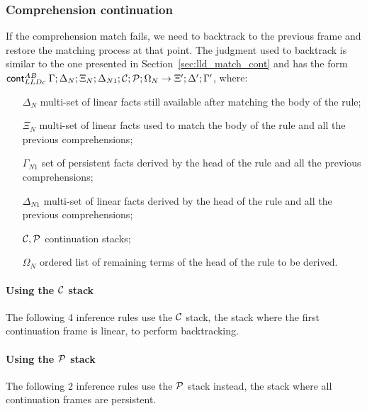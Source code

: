 \subsubsection{Comprehension continuation}

If the comprehension match fails, we need to backtrack to the previous frame and
restore the matching process at that point. The judgment used to backtrack is
similar to the one presented in Section~\ref{sec:lld_match_cont} and has the
form $\mathsf{cont}_{LLDc}^{AB} \; \Gamma; \Delta_N; \Xi_N; \Delta_{N1}; \mathcal{C}; \mathcal{P}; \Omega_N
\rightarrow \Xi'; \Delta'; \Gamma'$, where:

\begin{enumerate}
   \item[$\Delta_N$] multi-set of linear facts still available after matching
   the body of the rule;
   \item[$\Xi_N$] multi-set of linear facts used to match the body of the rule
   and all the previous comprehensions;
   \item[$\Gamma_{N1}$] set of persistent facts derived by the head of the rule
   and all the previous comprehensions;
   \item[$\Delta_{N1}$] multi-set of linear facts derived by the head of the
   rule and all the previous comprehensions;
   \item[$\mathcal{C}, \mathcal{P}$] continuation stacks;
   \item[$\Omega_N$] ordered list of remaining terms of the head of the rule to
   be derived.
\end{enumerate}

\paragraph{Using the $\mathcal{C}$ stack}

The following 4 inference rules use the $\mathcal{C}$ stack, the stack where the
first continuation frame is linear, to perform backtracking.



\paragraph{Using the $\mathcal{P}$ stack}

The following 2 inference rules use the $\mathcal{P}$ stack instead, the stack where all
continuation frames are persistent.



